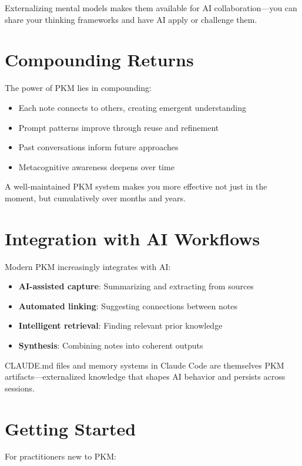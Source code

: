 Externalizing mental models makes them available for AI collaboration---you can share your thinking frameworks and have AI apply or challenge them.

\section{Compounding Returns}

The power of PKM lies in compounding:

\begin{itemize}
    \item Each note connects to others, creating emergent understanding
    \item Prompt patterns improve through reuse and refinement
    \item Past conversations inform future approaches
    \item Metacognitive awareness deepens over time
\end{itemize}

A well-maintained PKM system makes you more effective not just in the moment, but cumulatively over months and years.

\section{Integration with AI Workflows}

Modern PKM increasingly integrates with AI:

\begin{itemize}
    \item \textbf{AI-assisted capture}: Summarizing and extracting from sources
    \item \textbf{Automated linking}: Suggesting connections between notes
    \item \textbf{Intelligent retrieval}: Finding relevant prior knowledge
    \item \textbf{Synthesis}: Combining notes into coherent outputs
\end{itemize}

CLAUDE.md files and memory systems in Claude Code are themselves PKM artifacts---externalized knowledge that shapes AI behavior and persists across sessions.

\section{Getting Started}

For practitioners new to PKM:

